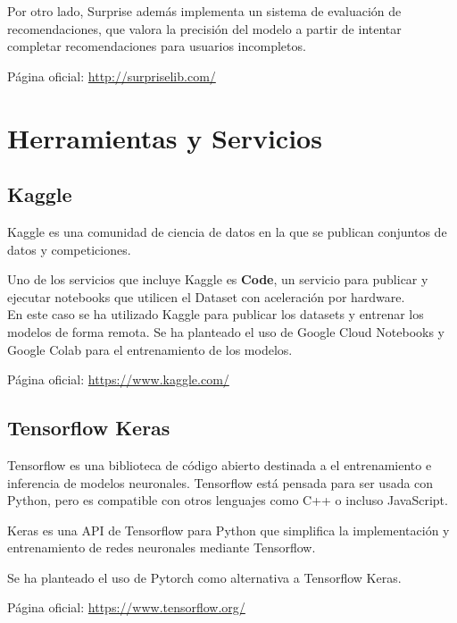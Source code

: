 Por otro lado, Surprise además implementa un sistema de evaluación de
recomendaciones, que valora la precisión del modelo a partir de intentar
completar recomendaciones para usuarios incompletos.

Página oficial: \href{http://surpriselib.com/}{http://surpriselib.com/}

\hypertarget{herramientas-y-servicios}{%
\section{Herramientas y Servicios}\label{herramientas-y-servicios}}

\hypertarget{kaggle}{%
\subsection{Kaggle}\label{kaggle}}

Kaggle es una comunidad de ciencia de datos en la que se publican
conjuntos de datos y competiciones.

Uno de los servicios que incluye Kaggle es \textbf{Code}, un servicio
para publicar y ejecutar notebooks que utilicen el Dataset con aceleración por hardware. \\
En este caso se ha utilizado Kaggle para publicar los datasets y
entrenar los modelos de forma remota. Se ha planteado el uso de Google Cloud Notebooks y Google Colab para el
entrenamiento de los modelos.

Página oficial: \href{https://www.kaggle.com/}{https://www.kaggle.com/}

\hypertarget{tensorflow-keras}{%
\subsection{Tensorflow Keras}\label{tensorflow-keras}}

Tensorflow \cite{tensorflow2015-whitepaper} es una biblioteca de código abierto destinada a el
entrenamiento e inferencia de modelos neuronales. Tensorflow está
pensada para ser usada con Python, pero es compatible con otros
lenguajes como C++ o incluso JavaScript.

Keras es una API de Tensorflow para Python que simplifica la
implementación y entrenamiento de redes neuronales mediante Tensorflow.

Se ha planteado el uso de Pytorch como alternativa a Tensorflow Keras.

Página oficial: \href{https://www.tensorflow.org/}{https://www.tensorflow.org/}




